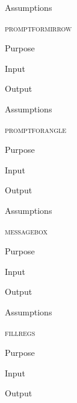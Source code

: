\documentclass[pdftex, 11pt]{article}
\begin{document}
\begin{description}
\begin{description}
			\item{Assumptions}


		\end{description}


	\item{\textsc{promptformirrow}}

		\begin{description}
			\item{Purpose}


			\item{Input}


			\item{Output}


			\item{Assumptions}


		\end{description}


	\item{\textsc{promptforangle}}

		\begin{description}
			\item{Purpose}


			\item{Input}


			\item{Output}


			\item{Assumptions}


		\end{description}


	\item{\textsc{messagebox}}
		\begin{description}
			\item{Purpose}


			\item{Input}


			\item{Output}


			\item{Assumptions}


		\end{description}



	\item{\textsc{fillregs}}
		\begin{description}
			\item{Purpose}


			\item{Input}


			\item{Output}



\end{description}
\end{description}
\end{document}
